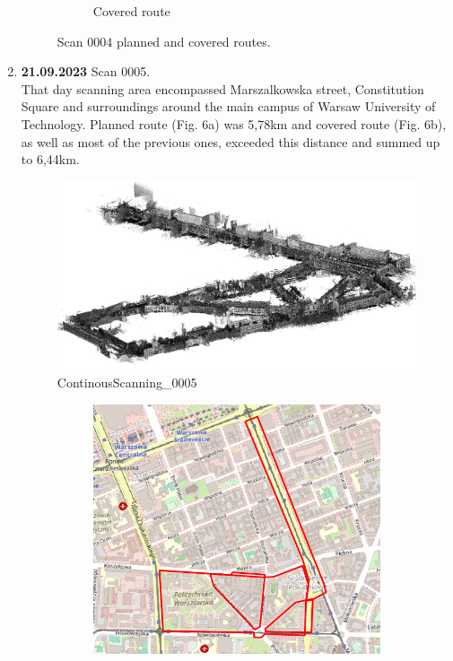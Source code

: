 \documentclass[a4paper,12pt]{book}
\begin{document}
\begin{enumerate}
\begin{figure}[H]
\begin{subfigure}{1\textwidth}
		\caption{Covered route}
		\label{fig:b4}
	\end{subfigure}
	\caption{Scan 0004 planned and covered routes.}
	\label{fig:fig4}
\end{figure}
\pagebreak
\item \textbf{21.09.2023} Scan 0005. \\
That day scanning area encompassed Marszalkowska street, Constitution Square and surroundings around the main campus of Warsaw University of Technology. Planned route (Fig. 6a) was 5,78km and covered route (Fig. 6b), as well as most of the previous ones, exceeded this distance and summed up to  6,44km. 
\begin{figure}[H]
	\includegraphics[width=1\linewidth]{cloud5}
	\caption{ContinousScanning\_0005}
\end{figure}
\begin{figure}[H]
	\centering
	\begin{subfigure}{.80\textwidth}
		\centering
		\includegraphics[width=1\linewidth]{route_p5}

\end{subfigure}
\end{figure}
\end{enumerate}
\end{document}
